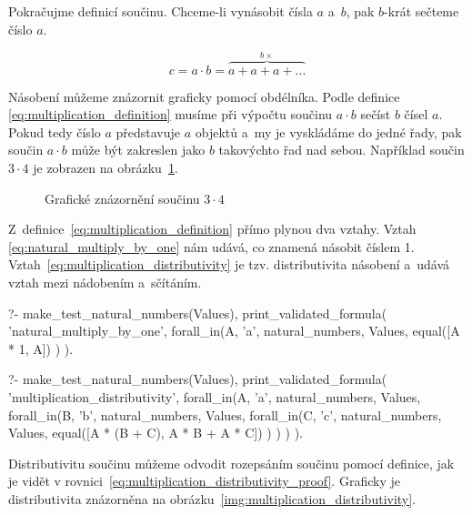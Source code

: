 Pokračujme definicí součinu. Chceme-li vynásobit čísla \(a\) a~\(b\), pak \(b\)-krát sečteme číslo \(a\).

\begin{equation}
\label{eq:multiplication_definition}
c = a \cdot b = \overbrace{a + a + a + ...}^{b \times}
\end{equation}

Násobení můžeme znázornit graficky pomocí obdélníka. Podle definice \eqref{eq:multiplication_definition} musíme při výpočtu součinu \(a \cdot b\) sečíst \(b\) čísel \(a\). Pokud tedy číslo \(a\) představuje \(a\) objektů a~my je vyskládáme do jedné řady, pak součin \(a \cdot b\) může být zakreslen jako \(b\) takovýchto řad nad sebou. Například součin \(3 \cdot 4\) je zobrazen na obrázku~\ref{img:multiplication_definition}. 

\begin{figure}[!h]
\centering
{}
\caption{Grafické znázornění součinu \(3 \cdot 4\)}
\label{img:multiplication_definition}
\end{figure}

Z~definice~\eqref{eq:multiplication_definition} přímo plynou dva vztahy. Vztah \eqref{eq:natural_multiply_by_one} nám udává, co znamená násobit číslem 1. Vztah~\eqref{eq:multiplication_distributivity} je tzv. distributivita násobení a~udává vztah mezi nádobením a~sčítáním.

\begin{fact}
\begin{prolog}
?-	make_test_natural_numbers(Values),
	print_validated_formula(
		'natural_multiply_by_one',
		forall_in(A, 'a', natural_numbers, Values,
			equal([A * 1, A])
		)
	).				
\end{prolog}
\begin{prolog}
?-	make_test_natural_numbers(Values),
	print_validated_formula(
		'multiplication_distributivity',
		forall_in(A, 'a', natural_numbers, Values,
			forall_in(B, 'b', natural_numbers, Values,
				forall_in(C, 'c', natural_numbers, Values,
					equal([A * (B + C), A * B + A * C])
				)
			)
		)
	).				
\end{prolog}
\end{fact}

Distributivitu součinu můžeme odvodit rozepsáním součinu pomocí definice, jak je vidět v rovnici~\ref{eq:multiplication_distributivity_proof}. Graficky je distributivita znázorněna na obrázku~\ref{img:multiplication_distributivity}.

